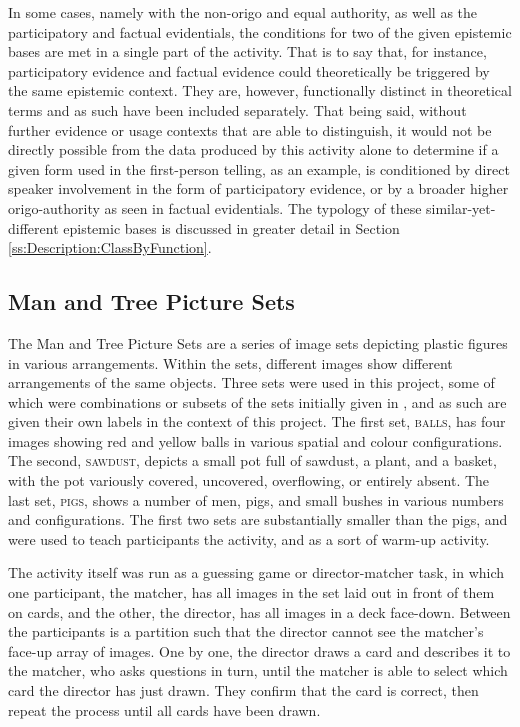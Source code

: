 In some cases, namely with the non-origo and equal authority, as well as the participatory and factual evidentials, the conditions for two of the given epistemic bases are met in a single part of the activity. That is to say that, for instance, participatory evidence and factual evidence could theoretically be triggered by the same epistemic context. They are, however, functionally distinct in theoretical terms and as such have been included separately. That being said, without further evidence or usage contexts that are able to distinguish, it would not be directly possible from the data produced by this activity alone to determine if a given form used in the first-person telling, as an example, is conditioned by direct speaker involvement in the form of participatory evidence, or by a broader higher origo-authority as seen in factual evidentials. The typology of these similar-yet-different epistemic bases is discussed in greater detail in Section \ref{ss:Description:ClassByFunction}.

\subsection{Man and Tree Picture Sets}
The Man and Tree Picture Sets \cite{Levinson1992} are a series of image sets depicting plastic figures in various arrangements. Within the sets, different images show different arrangements of the same objects. Three sets were used in this project, some of which were combinations or subsets of the sets initially given in , and as such are given their own labels in the context of this project. The first set, \textsc{balls}, has four images showing red and yellow balls in various spatial and colour configurations. The second, \textsc{sawdust}, depicts a small pot full of sawdust, a plant, and a basket, with the pot variously covered, uncovered, overflowing, or entirely absent. The last set, \textsc{pigs}, shows a number of men, pigs, and small bushes in various numbers and configurations. The first two sets are substantially smaller than the {pigs}, and were used to teach participants the activity, and as a sort of warm-up activity.

The activity itself was run as a guessing game or director-matcher task, in which one participant, the matcher, has all images in the set laid out in front of them on cards, and the other, the director, has all images in a deck face-down. Between the participants is a partition such that the director cannot see the matcher's face-up array of images. One by one, the director draws a card and describes it to the matcher, who asks questions in turn, until the matcher is able to select which card the director has just drawn. They confirm that the card is correct, then repeat the process until all cards have been drawn.

